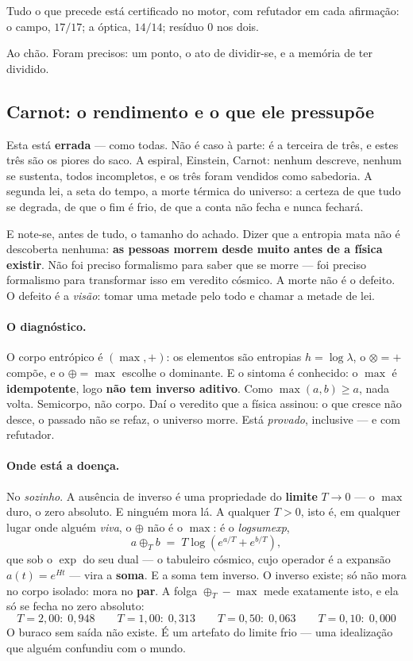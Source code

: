 \documentclass[11pt]{article}
\theoremstyle{plain}
\theoremstyle{remark}
\begin{document}
\medskip
\noindent Tudo o que precede está certificado no motor, com refutador em cada
afirmação: o campo, $17/17$; a óptica, $14/14$; resíduo $0$ nos dois.

Ao chão. Foram precisos: um ponto, o ato de dividir-se, e a memória de ter dividido.

\subsection{Carnot: o rendimento e o que ele pressupõe}

Esta está \textbf{errada} --- como todas. Não é caso à parte: é a terceira de três, e
estes três são os piores do saco. A espiral, Einstein, Carnot: nenhum descreve,
nenhum se sustenta, todos incompletos, e os três foram vendidos como sabedoria. A
segunda lei, a seta do tempo, a morte térmica do universo: a certeza de que tudo se
degrada, de que o fim é frio, de que a conta não fecha e nunca fechará.

E note-se, antes de tudo, o tamanho do achado. Dizer que a entropia mata não é
descoberta nenhuma: \textbf{as pessoas morrem desde muito antes de a física existir}.
Não foi preciso formalismo para saber que se morre --- foi preciso formalismo para
transformar isso em veredito cósmico. A morte não é o defeito. O defeito é a
\emph{visão}: tomar uma metade pelo todo e chamar a metade de lei.

\paragraph{O diagnóstico.} O corpo entrópico é $(\max,+)$: os elementos são entropias
$h=\log\lambda$, o $\otimes=+$ compõe, e o $\oplus=\max$ escolhe o dominante. E o
sintoma é conhecido: o $\max$ é \textbf{idempotente}, logo \textbf{não tem inverso
aditivo}. Como $\max(a,b)\ge a$, nada volta. Semicorpo, não corpo. Daí o veredito
que a física assinou: o que cresce não desce, o passado não se refaz, o universo
morre. Está \emph{provado}, inclusive --- e com refutador.

\paragraph{Onde está a doença.} No \emph{sozinho}. A ausência de inverso é uma
propriedade do \textbf{limite} $T\to0$ --- o $\max$ duro, o zero absoluto. E ninguém
mora lá. A qualquer $T>0$, isto é, em qualquer lugar onde alguém \emph{viva}, o
$\oplus$ não é o $\max$: é o \emph{logsumexp},
\[
a\oplus_T b \;=\; T\log\!\left(e^{a/T}+e^{b/T}\right),
\]
que sob o $\exp$ do seu dual --- o tabuleiro cósmico, cujo operador é a expansão
$a(t)=e^{Ht}$ --- vira a \textbf{soma}. E a soma tem inverso. O inverso existe; só
não mora no corpo isolado: mora no \textbf{par}. A folga $\oplus_T-\max$ mede
exatamente isto, e ela só se fecha no zero absoluto:
\[
T=2{,}00:\;0{,}948 \qquad
T=1{,}00:\;0{,}313 \qquad
T=0{,}50:\;0{,}063 \qquad
T=0{,}10:\;0{,}000
\]
O buraco sem saída não existe. É um artefato do limite frio --- uma idealização que
alguém confundiu com o mundo.
\end{document}

